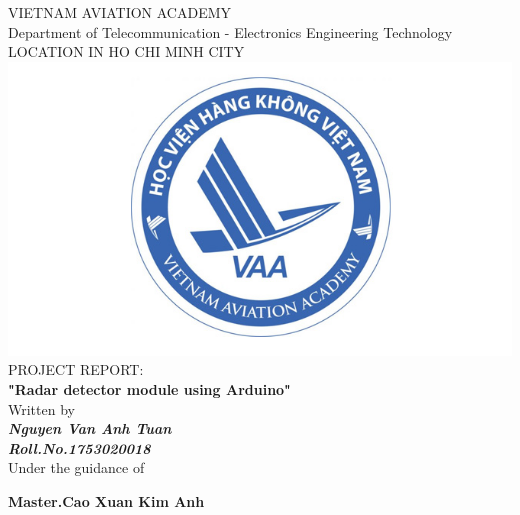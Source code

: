 \documentclass[13pt,a4paper]{report}
\begin{document}
    \centering
    \LARGE{\textsc{VIETNAM AVIATION ACADEMY}}\\
    \vspace{3mm}
    \normalsize{Department of Telecommunication - Electronics Engineering Technology} \\
    \vspace{3mm}
    \large{LOCATION IN HO CHI MINH CITY} \\
    \vspace{3mm}
    \includegraphics[scale=0.3]{logo.jpg} \\
    \vspace{3mm}
    \normalsize{PROJECT REPORT: } \\ 
    \vspace{15mm}
    \huge{\textbf{"Radar detector module using Arduino"}} \\
    \vspace{20mm}
    \normalsize{Written by} \\
    \vspace{3mm}
    \large{\textbf{\textit{Nguyen Van Anh Tuan}}} \\
    \vspace{3mm}
    \textbf{{\large{\textit{Roll.No.1753020018}}}} \\
    \vspace{15mm}
    \large{Under the guidance of} \\ 
    \vspace{10mm}
    \centerline{\textbf{\large{Master.Cao Xuan Kim Anh}}}
    
    \pagestyle{fancy}
    \fancyhf{}
    \cfoot{\today}
    \renewcommand{\headrulewidth}{2pt}
    \renewcommand{\footrulewidth}{1pt}
\end{document}
